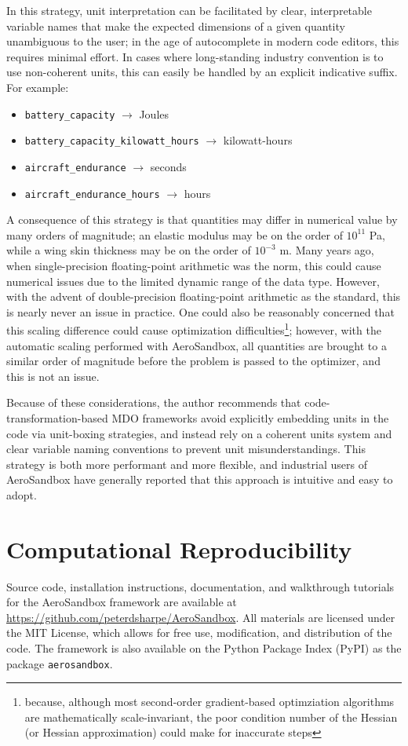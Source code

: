 In this strategy, unit interpretation can be facilitated by clear, interpretable variable names that make the expected dimensions of a given quantity unambiguous to the user; in the age of autocomplete in modern code editors, this requires minimal effort. In cases where long-standing industry convention is to use non-coherent units, this can easily be handled by an explicit indicative suffix. For example:

\begin{itemize}[noitemsep]
    \item \texttt{battery_capacity} $\rightarrow$ Joules
    \item \texttt{battery_capacity_kilowatt_hours} $\rightarrow$ kilowatt-hours
    \item \texttt{aircraft_endurance} $\rightarrow$ seconds
    \item \texttt{aircraft_endurance_hours} $\rightarrow$ hours
\end{itemize}

A consequence of this strategy is that quantities may differ in numerical value by many orders of magnitude; an elastic modulus may be on the order of $10^{11}$ Pa, while a wing skin thickness may be on the order of $10^{-3}$ m. Many years ago, when single-precision floating-point arithmetic was the norm, this could cause numerical issues due to the limited dynamic range of the data type. However, with the advent of double-precision floating-point arithmetic as the standard, this is nearly never an issue in practice. One could also be reasonably concerned that this scaling difference could cause optimization difficulties\footnote{because, although most second-order gradient-based optimziation algorithms are mathematically scale-invariant, the poor condition number of the Hessian (or Hessian approximation) could make for inaccurate steps}; however, with the automatic scaling performed with AeroSandbox, all quantities are brought to a similar order of magnitude before the problem is passed to the optimizer, and this is not an issue.

Because of these considerations, the author recommends that code-transformation-based MDO frameworks avoid explicitly embedding units in the code via unit-boxing strategies, and instead rely on a coherent units system and clear variable naming conventions to prevent unit misunderstandings. This strategy is both more performant and more flexible, and industrial users of AeroSandbox have generally reported that this approach is intuitive and easy to adopt.

\section{Computational Reproducibility}
\label{sec:asb-reproducibility}

Source code, installation instructions, documentation, and walkthrough tutorials for the AeroSandbox framework are available at \url{https://github.com/peterdsharpe/AeroSandbox}. All materials are licensed under the MIT License, which allows for free use, modification, and distribution of the code. The framework is also available on the Python Package Index (PyPI) as the package \texttt{aerosandbox}.